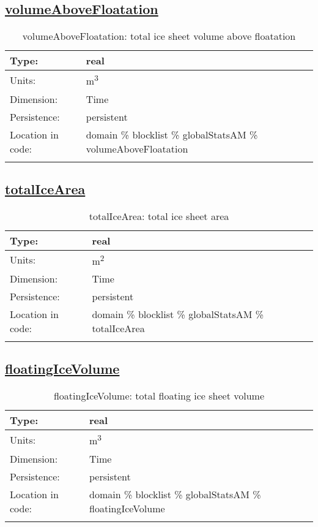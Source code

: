 \subsection[volumeAboveFloatation]{\hyperref[sec:var_tab_globalStatsAM]{volumeAboveFloatation}}
\label{subsec:var_sec_globalStatsAM_volumeAboveFloatation}
\begin{center}
\begin{longtable}{| p{2.0in} | p{4.0in} |}
        \hline 
        Type: & real \\
        \hline 
        Units: & \si{m^3} \\
        \hline 
        Dimension: & Time \\
        \hline 
        Persistence: & persistent \\
        \hline 
         Location in code: & domain \% blocklist \% globalStatsAM \% volumeAboveFloatation \\
         \hline 
    \caption{volumeAboveFloatation: total ice sheet volume above floatation}
\end{longtable}
\end{center}
\subsection[totalIceArea]{\hyperref[sec:var_tab_globalStatsAM]{totalIceArea}}
\label{subsec:var_sec_globalStatsAM_totalIceArea}
\begin{center}
\begin{longtable}{| p{2.0in} | p{4.0in} |}
        \hline 
        Type: & real \\
        \hline 
        Units: & \si{m^2} \\
        \hline 
        Dimension: & Time \\
        \hline 
        Persistence: & persistent \\
        \hline 
         Location in code: & domain \% blocklist \% globalStatsAM \% totalIceArea \\
         \hline 
    \caption{totalIceArea: total ice sheet area}
\end{longtable}
\end{center}
\subsection[floatingIceVolume]{\hyperref[sec:var_tab_globalStatsAM]{floatingIceVolume}}
\label{subsec:var_sec_globalStatsAM_floatingIceVolume}
\begin{center}
\begin{longtable}{| p{2.0in} | p{4.0in} |}
        \hline 
        Type: & real \\
        \hline 
        Units: & \si{m^3} \\
        \hline 
        Dimension: & Time \\
        \hline 
        Persistence: & persistent \\
        \hline 
         Location in code: & domain \% blocklist \% globalStatsAM \% floatingIceVolume \\
         \hline 
    \caption{floatingIceVolume: total floating ice sheet volume}
\end{longtable}
\end{center}
